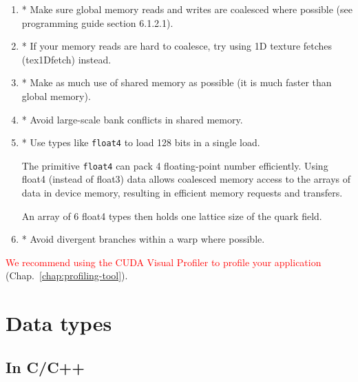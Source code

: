 \begin{enumerate}
\item * Make sure global memory reads and writes are coalesced where
  possible (see programming guide section 6.1.2.1).

\item * If your memory reads are hard to coalesce, try using 1D
  texture fetches (tex1Dfetch) instead.
\item * Make as much use of shared memory as possible (it is much
  faster than global memory).
\item  * Avoid large-scale bank conflicts in shared memory.
\item * Use types like \verb!float4! to load 128 bits in a single
  load.

  The primitive \verb!float4! can pack 4 floating-point number
  efficiently.  Using float4 (instead of float3) data allows coalesced
  memory access to the arrays of data in device memory, resulting in
  efficient memory requests and transfers.

  An array of 6 float4 types then holds one lattice size of the quark
  field.

\item  * Avoid divergent branches within a warp where possible.
\end{enumerate}


\textcolor{red}{We recommend using the CUDA Visual Profiler to profile
  your application} (Chap.~\ref{chap:profiling-tool}).

\section{Data types}
\label{sec:data-types}

\subsection{In C/C++}
\label{sec:cc++}


